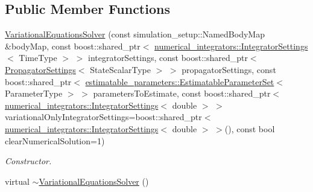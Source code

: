 \subsection*{Public Member Functions}
\begin{DoxyCompactItemize}
\item 
\hyperlink{classtudat_1_1propagators_1_1VariationalEquationsSolver_adc3b68e3033ad7cfefe4266321e85095}{Variational\+Equations\+Solver} (const simulation\+\_\+setup\+::\+Named\+Body\+Map \&body\+Map, const boost\+::shared\+\_\+ptr$<$ \hyperlink{classtudat_1_1numerical__integrators_1_1IntegratorSettings}{numerical\+\_\+integrators\+::\+Integrator\+Settings}$<$ Time\+Type $>$ $>$ integrator\+Settings, const boost\+::shared\+\_\+ptr$<$ \hyperlink{classtudat_1_1propagators_1_1PropagatorSettings}{Propagator\+Settings}$<$ State\+Scalar\+Type $>$ $>$ propagator\+Settings, const boost\+::shared\+\_\+ptr$<$ \hyperlink{classtudat_1_1estimatable__parameters_1_1EstimatableParameterSet}{estimatable\+\_\+parameters\+::\+Estimatable\+Parameter\+Set}$<$ Parameter\+Type $>$ $>$ parameters\+To\+Estimate, const boost\+::shared\+\_\+ptr$<$ \hyperlink{classtudat_1_1numerical__integrators_1_1IntegratorSettings}{numerical\+\_\+integrators\+::\+Integrator\+Settings}$<$ double $>$ $>$ variational\+Only\+Integrator\+Settings=boost\+::shared\+\_\+ptr$<$ \hyperlink{classtudat_1_1numerical__integrators_1_1IntegratorSettings}{numerical\+\_\+integrators\+::\+Integrator\+Settings}$<$ double $>$ $>$(), const bool clear\+Numerical\+Solution=1)
\begin{DoxyCompactList}\small\item\em Constructor. \end{DoxyCompactList}\item 
virtual \hyperlink{classtudat_1_1propagators_1_1VariationalEquationsSolver_abbc0a83ac50173cc4b1aae6985bc2853}{$\sim$\+Variational\+Equations\+Solver} ()\hypertarget{classtudat_1_1propagators_1_1VariationalEquationsSolver_abbc0a83ac50173cc4b1aae6985bc2853}{}\label{classtudat_1_1propagators_1_1VariationalEquationsSolver_abbc0a83ac50173cc4b1aae6985bc2853}


\end{DoxyCompactItemize}
